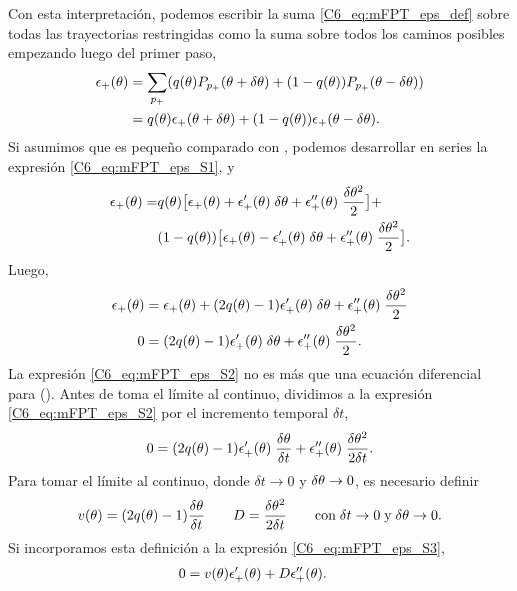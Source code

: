 \documentclass[./main.tex]{subfiles}
\begin{document}
Con esta interpretación, podemos escribir la suma \ref{C6_eq:mFPT_eps_def} sobre todas las trayectorias restringidas como la suma sobre todos los caminos posibles empezando luego del primer paso,
\begin{align}
    \epsilon_{+}(\theta) &= \sum_{p_{+}} ( q(\theta) P_{p_{+}}(\theta + \delta\theta) + (1-q(\theta)) P_{p_{+}}(\theta - \delta\theta)) \\
    & = q(\theta) \epsilon_{+}(\theta+\delta\theta) +  (1-q(\theta)) \epsilon_{+}(\theta - \delta\theta) 
    \label{C6_eq:mFPT_eps_S1}.
\end{align}
Si asumimos que \deltax es pequeño comparado con \xx, podemos desarrollar en series la expresión \ref{C6_eq:mFPT_eps_S1}, y
\begin{align}
    \epsilon_{+}(\theta) = & q(\theta) \big[  \epsilon_{+}(\theta) + \epsilon_{+}'(\theta) \; \delta\theta + \epsilon_{+}''(\theta) \; \frac{\delta\theta^2}{2} \big] + \nonumber \\  & (1-q(\theta)) \big[  \epsilon_{+}(\theta) - \epsilon_{+}'(\theta) \; \delta\theta + \epsilon_{+}''(\theta) \; \frac{\delta\theta^2}{2} \big].
\end{align}
Luego,
\begin{align}
    \epsilon_{+}(\theta) &=  \epsilon_{+}(\theta) + (2q(\theta)-1) \epsilon_{+}'(\theta) \; \delta\theta + \epsilon_{+}''(\theta) \; \frac{\delta\theta^2}{2} \\
    0 &=  (2q(\theta)-1) \epsilon_{+}'(\theta) \; \delta\theta + \epsilon_{+}''(\theta) \; \frac{\delta\theta^2}{2}. \label{C6_eq:mFPT_eps_S2}
\end{align}
La expresión \ref{C6_eq:mFPT_eps_S2} no es más que una ecuación diferencial para \epsplus(\xx). Antes de toma el límite al continuo, dividimos a la expresión \ref{C6_eq:mFPT_eps_S2} por el incremento temporal $\delta t$,
\begin{align}
     0 =  (2q(\theta)-1) \epsilon_{+}'(\theta) \; \frac{\delta\theta}{\delta t} + \epsilon_{+}''(\theta) \; \frac{\delta\theta^2}{2 \delta t}. 
     \label{C6_eq:mFPT_eps_S3}
\end{align}
Para tomar el límite al continuo, donde $\delta t \rightarrow   0 $ y $\delta\theta \rightarrow 0$, es necesario definir
\begin{equation}
    v(\theta) = (2q(\theta)-1) \frac{\delta\theta}{\delta t} \qquad D = \frac{\delta\theta^2}{2 \delta t} \qquad \text{con} \; \delta t \rightarrow   0 \; \text{y} \; \delta\theta \rightarrow 0 .
    \label{C6_eq:mFPT_eps_def_vD}
\end{equation}
Si incorporamos esta definición a la expresión \ref{C6_eq:mFPT_eps_S3},
\begin{align}
     0 &=  v(\theta) \epsilon_{+}'(\theta) + D \epsilon_{+}''(\theta) .
     \label{C6_eq:mFPT_eps_S4}
\end{align}
\end{document}
